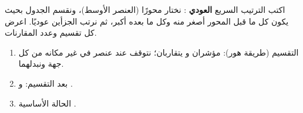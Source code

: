 \begin{statement}
اكتب الترتيب السريع \textbf{العودي} : نختار محورًا (العنصر الأوسط)، ونقسم الجدول بحيث يكون كل ما قبل المحور أصغر منه وكل ما بعده أكبر، ثم نرتب الجزأين عوديًا. اعرض كل تقسيم وعدد المقارنات.
\end{statement}
\begin{stepsbox}\begin{enumerate}
\item التقسيم (طريقة هور): مؤشران  و  يتقاربان؛ نتوقف عند عنصر في غير مكانه من كل جهة ونبدلهما.
\item بعد التقسيم:  و .
\item الحالة الأساسية .
\end{enumerate}\end{stepsbox}
